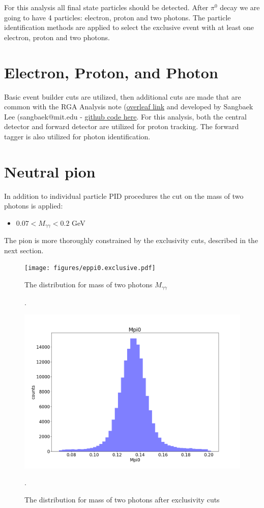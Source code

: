
For this analysis all final state particles should be detected.
After $\pi^0$ decay we are going to have 4 particles: electron, proton and two photons.
The particle identification methods are applied to select the exclusive event with at least one electron, proton and two photons. 


\section{Electron, Proton, and Photon}
Basic event builder cuts are utilized, then additional cuts are made that are common with the RGA Analysis note (\href{https://www.overleaf.com/project/5ea737720942930001ff5e9c}{overleaf link} and developed by Sangbaek Lee (sangbaek@mit.edu - \href{https://github.com/Sangbaek/analysis_code/tree/analysis/pid}{github code here}. For this analysis, both the central detector and forward detector are utilized for proton tracking. The forward tagger is also utilized for photon identification. 



\section{Neutral pion}
In addition to individual particle PID procedures the cut on the mass of two photons is applied:
\begin{itemize}
	\item $0.07<M_{\gamma\gamma}<0.2$ GeV
\end{itemize}
The pion is more thoroughly constrained by the exclusivity cuts, described in the next section.


\begin{figure}[hbt]
	\centering
	\texttt{[image: figures/eppi0.exclusive.pdf]}
	
	\caption{The distribution for mass of two photons $M_{\gamma\gamma}$}.
	\label{fig:ggmass}
	
	\centering
	\includegraphics[page=6,width=0.6\linewidth]{pid_figs/Mpi0.png}
	
	\caption{The distribution for mass of two photons after exclusivity cuts}.
	\label{fig:ggmass_after}
	
\end{figure}

